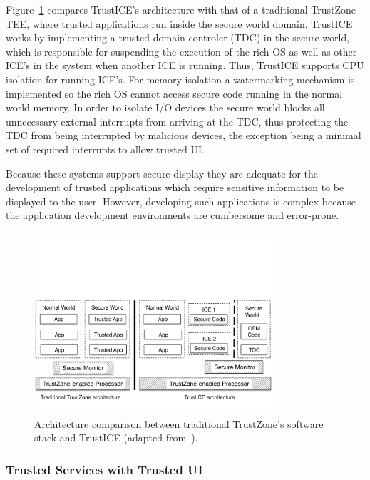Figure~\ref{fig:trustICE_architecture} compares TrustICE's architecture with that of a traditional TrustZone TEE, where trusted applications run inside the secure world domain. TrustICE works by implementing a trusted domain controler (TDC) in the secure world, which is responsible for suspending the execution of the rich OS as well as other ICE's in the system when another ICE is running. Thus, TrustICE supports CPU isolation for running ICE's. For memory isolation a watermarking mechanism is implemented so the rich OS cannot access secure code running in the normal world memory. In order to isolate I/O devices the secure world blocks all unnecessary external interrupts from arriving at the TDC, thus protecting the TDC from being interrupted by malicious devices, the exception being a minimal set of required interrupts to allow trusted UI.

Because these systems support secure display they are adequate for the development of trusted applications which require sensitive information to be displayed to the user. However, developing such applications is complex because the application development environments are cumbersome and error-prone.

\begin{figure}[t!]
	\centering
	\includegraphics[width=0.80\textwidth]{img/trustICE.pdf}
	\caption{Architecture comparison between traditional TrustZone's software stack and TrustICE (adapted from~\cite{sun2015trustice}).}
	\label{fig:trustICE_architecture}
\end{figure}

\subsubsection{Trusted Services with Trusted UI}

